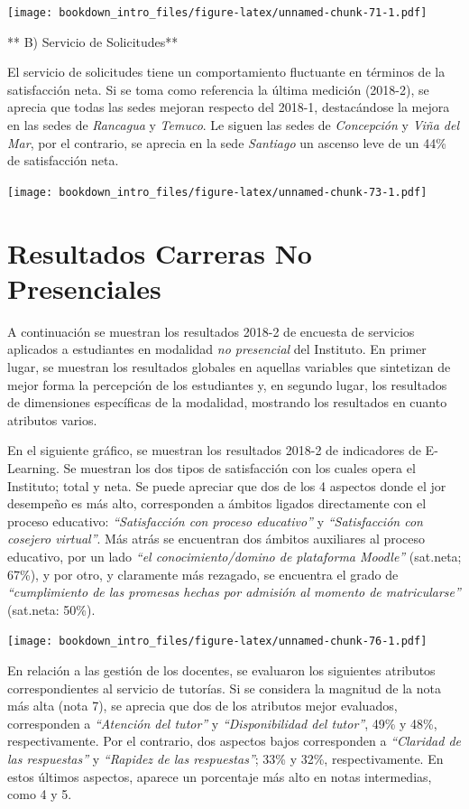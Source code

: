 \documentclass[]{book}
\begin{document}
\texttt{[image: bookdown\_intro\_files/figure-latex/unnamed-chunk-71-1.pdf]}

** B) Servicio de Solicitudes**

El servicio de solicitudes tiene un comportamiento fluctuante en
términos de la satisfacción neta. Si se toma como referencia la última
medición (2018-2), se aprecia que todas las sedes mejoran respecto del
2018-1, destacándose la mejora en las sedes de \emph{Rancagua} y
\emph{Temuco}. Le siguen las sedes de \emph{Concepción} y \emph{Viña del
Mar}, por el contrario, se aprecia en la sede \emph{Santiago} un ascenso
leve de un 44\% de satisfacción neta.

\texttt{[image: bookdown\_intro\_files/figure-latex/unnamed-chunk-73-1.pdf]}

\chapter{Resultados Carreras No
Presenciales}\label{resultados-carreras-no-presenciales}

A continuación se muestran los resultados 2018-2 de encuesta de
servicios aplicados a estudiantes en modalidad \emph{no presencial} del
Instituto. En primer lugar, se muestran los resultados globales en
aquellas variables que sintetizan de mejor forma la percepción de los
estudiantes y, en segundo lugar, los resultados de dimensiones
específicas de la modalidad, mostrando los resultados en cuanto
atributos varios.

En el siguiente gráfico, se muestran los resultados 2018-2 de
indicadores de E-Learning. Se muestran los dos tipos de satisfacción con
los cuales opera el Instituto; total y neta. Se puede apreciar que dos
de los 4 aspectos donde el jor desempeño es más alto, corresponden a
ámbitos ligados directamente con el proceso educativo:
\emph{``Satisfacción con proceso educativo''} y \emph{``Satisfacción con
cosejero virtual''}. Más atrás se encuentran dos ámbitos auxiliares al
proceso educativo, por un lado \emph{``el conocimiento/domino de
plataforma Moodle''} (sat.neta; 67\%), y por otro, y claramente más
rezagado, se encuentra el grado de \emph{``cumplimiento de las promesas
hechas por admisión al momento de matricularse''} (sat.neta: 50\%).

\texttt{[image: bookdown\_intro\_files/figure-latex/unnamed-chunk-76-1.pdf]}

En relación a las gestión de los docentes, se evaluaron los siguientes
atributos correspondientes al servicio de tutorías. Si se considera la
magnitud de la nota más alta (nota 7), se aprecia que dos de los
atributos mejor evaluados, corresponden a \emph{``Atención del tutor''}
y \emph{``Disponibilidad del tutor''}, 49\% y 48\%, respectivamente. Por
el contrario, dos aspectos bajos corresponden a \emph{``Claridad de las
respuestas''} y \emph{``Rapidez de las respuestas''}; 33\% y 32\%,
respectivamente. En estos últimos aspectos, aparece un porcentaje más
alto en notas intermedias, como 4 y 5.
\end{document}
